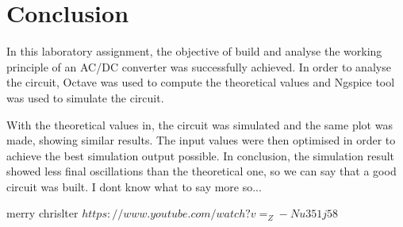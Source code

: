\section{Conclusion}
\label{sec:conclusion}

In this laboratory assignment, the objective of build and analyse the working principle of an AC/DC converter was successfully achieved.
In order to analyse the circuit, Octave was used to compute the theoretical values and Ngspice tool
was used to simulate the circuit.

With the theoretical values in, the circuit was simulated and the same plot was made, showing
similar results. The input values were then optimised in order to achieve the best simulation output
possible. In conclusion, the simulation result showed less final oscillations than the theoretical one, so we can say that a good circuit was built. I dont know what to say more so...

merry chrislter
$https://www.youtube.com/watch?v=_Z-Nu351j58$

